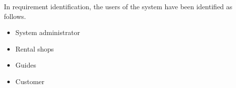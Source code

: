 In requirement identification, the users of the system have been identified as follows.
\begin{itemize}
    \item System administrator
    \item Rental shops
    \item Guides
    \item Customer
\end{itemize}